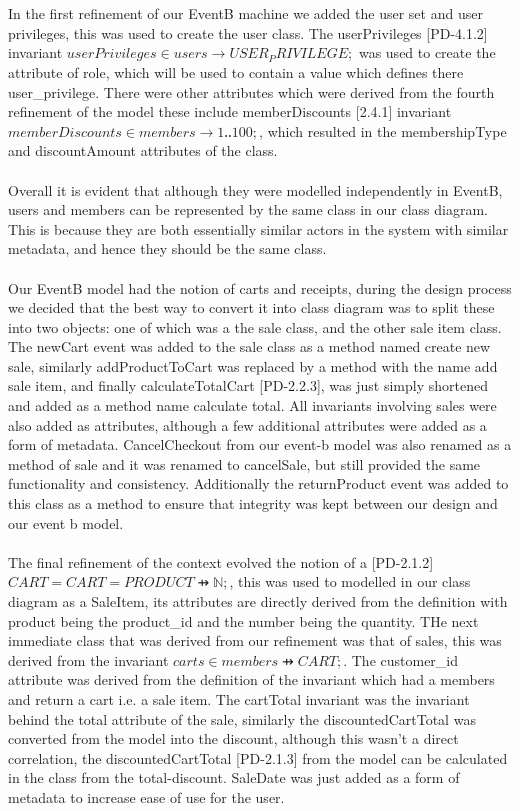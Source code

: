 \documentclass[a4paper]{article}
\begin{document}
\\\\
In the first refinement of our EventB machine we added the user set and user privileges, this was used to create the user class. The userPrivileges [PD-4.1.2] invariant \(userPrivileges ∈ users → USER_PRIVILEGE; \) was used to create the attribute of role, which will be used to contain a value which defines there user\_privilege. There were other attributes which were derived from the fourth refinement of the model these include memberDiscounts [2.4.1] invariant \(memberDiscounts ∈ members → 1‥100; \), which resulted in the membershipType and discountAmount attributes of the class.
\\\\
Overall it is evident that although they were modelled independently in EventB, users and members can be represented by the same class in our class diagram. This is because they are both essentially similar actors in the system with similar metadata, and hence they should be the same class.
\\\\
Our EventB model had the notion of carts and receipts, during the design process we decided that the best way to convert it into class diagram was to split these into two objects: one of which was a the sale class, and the other sale item class. The newCart event was added to the sale class as a method named create new sale, similarly addProductToCart was replaced by a method with the name add sale item, and finally calculateTotalCart [PD-2.2.3], was just simply shortened and added as a method name calculate total. All invariants involving sales were also added as attributes, although a few additional attributes were added as a form of metadata. CancelCheckout from our event-b model was also renamed as a method of sale and it was renamed to cancelSale, but still provided the same functionality and consistency. Additionally the returnProduct  event was added to this class as a method to ensure that integrity was kept between our design and our event b model.
\\\\
The final refinement of the context evolved the notion of a [PD-2.1.2] \(CART = CART = PRODUCT ⇸ ℕ; \), this was used to modelled in our class diagram as a SaleItem, its attributes are directly derived from the definition with product being the product\_id and the number being the quantity. THe next immediate class that was derived from our refinement was that of sales, this was derived from the invariant \(carts ∈ members ⇸ CART; \). The customer\_id attribute was derived from the definition of the invariant which had a members and return a cart i.e. a sale item. The cartTotal invariant  was the invariant behind the total attribute of the sale, similarly the discountedCartTotal  was converted from the model into the discount, although this wasn't a direct correlation, the discountedCartTotal [PD-2.1.3] from the model can be calculated in the class from the total-discount. SaleDate was just added as a form of metadata to increase ease of use  for the user. 
\end{document}
